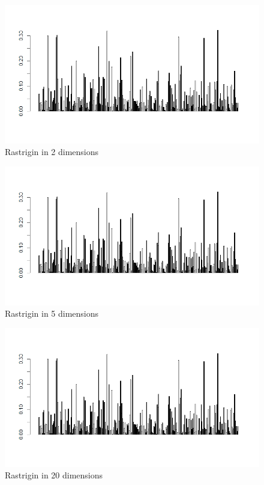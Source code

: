 \documentclass{article}
\begin{document}
\begin{figure}[h!]
    \centering
    \includegraphics[width=1\textwidth]{./results/Rastrigin2}
    \caption{Rastrigin in 2 dimensions}
    \label{fig:Rastrigin in 2 dimensions}
\end{figure}

\begin{figure}[h!]
    \centering
    \includegraphics[width=1\textwidth]{./results/Rastrigin5}
    \caption{Rastrigin in 5 dimensions}
    \label{fig:Rastrigin in 5 dimensions}
\end{figure}

\begin{figure}[h!]
    \centering
    \includegraphics[width=1\textwidth]{./results/Rastrigin20}
    \caption{Rastrigin in 20 dimensions}
    \label{fig:Rastrigin in 20 dimensions}
\end{figure}
\end{document}
